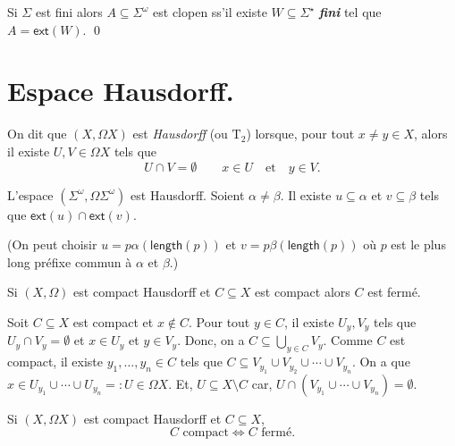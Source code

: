 \documentclass[./main]{subfiles}
\begin{document}
  \begin{crlr}
    Si $\Sigma$ est fini alors $A \subseteq \Sigma^\omega$ est clopen ss'il existe $W \subseteq \Sigma^\star$ \textit{\textbf{fini}} tel que $A = \mathsf{ext}(W)$.
    \qed
  \end{crlr}

  \section{Espace Hausdorff.}

  \begin{defn}
    On dit que $(X, \Omega X)$ est \textit{Hausdorff} (ou $\mathrm{T_2}$) lorsque, pour tout $x \neq  y \in X$, alors il existe $U, V \in \Omega X$ tels que 
    \[
    U \cap V = \emptyset \quad\quad x \in U \quad\text{et}\quad y \in V
    .\]
  \end{defn}

  \begin{exm}
    L'espace $(\Sigma^\omega, \Omega\Sigma^\omega)$ est Hausdorff.
    Soient $\alpha \neq \beta$.
    Il existe $u \subseteq \alpha$ et $v \subseteq \beta$ tels que $\mathsf{ext}(u) \cap \mathsf{ext}(v)$.

    (On peut choisir $u = p \alpha(\mathsf{length}(p))$ et $v = p \beta(\mathsf{length}(p))$ où $p $ est le plus long préfixe commun à $\alpha$ et $\beta$.)
  \end{exm}

  \begin{prop}
    Si $(X, \Omega)$ est compact Hausdorff et $C \subseteq X$ est compact alors $C$ est fermé.
  \end{prop}
  \begin{prv}
    Soit $C \subseteq X$ est compact et $x \not\in C$.
    Pour tout $y \in C$, il existe $U_y, V_y$ tels que $U_y \cap V_y = \emptyset$ et $x \in U_y$ et $y \in V_y$.
    Donc, on a $C \subseteq \bigcup_{y \in C} V_y$.
    Comme $C$ est compact, il existe $y_1, \ldots, y_n \in C$ tels que $C \subseteq V_{y_1} \cup V_{y_2} \cup \cdots \cup V_{y_n}$.
    On a que $x \in U_{y_1} \cup \cdots  \cup U_{y_n} =: U \in \Omega X$.
    Et, $U \subseteq X \setminus C$ car, $U \cap (V_{y_1} \cup \cdots \cup V_{y_n}) = \emptyset$.
  \end{prv}

  \begin{crlr}
    Si $(X, \Omega X)$ est compact Hausdorff et $C \subseteq X$, 
    \[
    \text{$C$ compact} \iff \text{$C$ fermé}
    .\] 
  \end{crlr}
\end{document}
